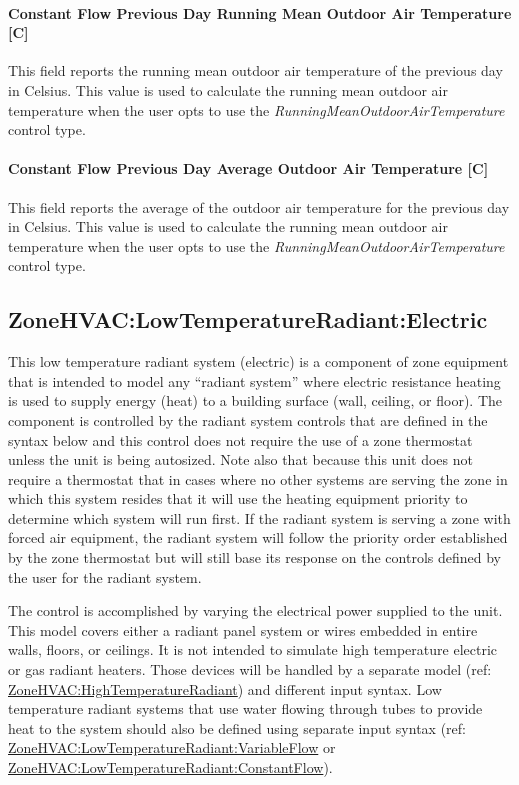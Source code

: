 \paragraph{Constant Flow Previous Day Running Mean Outdoor Air Temperature {[}C{]}}\label{constant-flow-previous-day-running-mean-outdoor-air-temperature}

This field reports the running mean outdoor air temperature of the previous day in Celsius. This value is used to calculate the running mean outdoor air temperature when the user opts to use the \emph{RunningMeanOutdoorAirTemperature} control type.

\paragraph{Constant Flow Previous Day Average Outdoor Air Temperature {[}C{]}}\label{constant-flow-previous-day-average-outdoor-air-temperature}

This field reports the average of the outdoor air temperature for the previous day in Celsius. This value is used to calculate the running mean outdoor air temperature when the user opts to use the \emph{RunningMeanOutdoorAirTemperature} control type.

\subsection{ZoneHVAC:LowTemperatureRadiant:Electric}\label{zonehvaclowtemperatureradiantelectric}

This low temperature radiant system (electric) is a component of zone equipment that is intended to model any ``radiant system'' where electric resistance heating is used to supply energy (heat) to a building surface (wall, ceiling, or floor). The component is controlled by the radiant system controls that are defined in the syntax below and this control does not require the use of a zone thermostat unless the unit is being autosized. Note also that because this unit does not require a thermostat that in cases where no other systems are serving the zone in which this system resides that it will use the heating equipment priority to determine which system will run first. If the radiant system is serving a zone with forced air equipment, the radiant system will follow the priority order established by the zone thermostat but will still base its response on the controls defined by the user for the radiant system.

The control is accomplished by varying the electrical power supplied to the unit. This model covers either a radiant panel system or wires embedded in entire walls, floors, or ceilings. It is not intended to simulate high temperature electric or gas radiant heaters. Those devices will be handled by a separate model (ref: \hyperref[zonehvachightemperatureradiant]{ZoneHVAC:HighTemperatureRadiant}) and different input syntax. Low temperature radiant systems that use water flowing through tubes to provide heat to the system should also be defined using separate input syntax (ref: \hyperref[zonehvaclowtemperatureradiantvariableflow]{ZoneHVAC:LowTemperatureRadiant:VariableFlow} or \hyperref[zonehvaclowtemperatureradiantconstantflow]{ZoneHVAC:LowTemperatureRadiant:ConstantFlow}).

